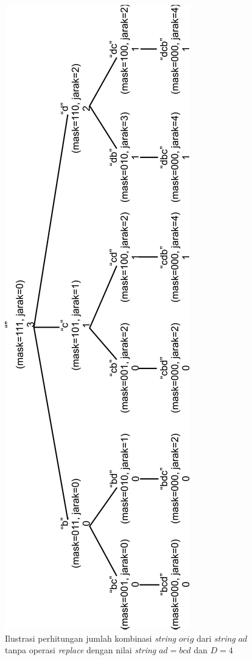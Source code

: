 \begin{figure}
	\centerline{ \includegraphics[scale=0.3]{assets/images/new/jpg/subproblem1-rotated.jpg}}
	\caption{Ilustrasi perhitungan jumlah kombinasi \textit{string} $ orig $ dari \textit{string} $ ad $ tanpa operasi \textit{replace} dengan nilai \textit{string} $ ad = bcd $ dan $ D=4 $}
	\label{figure:ilustrasi_perhitungan_kombinasi_orig_tanpa_replace}
\end{figure}

